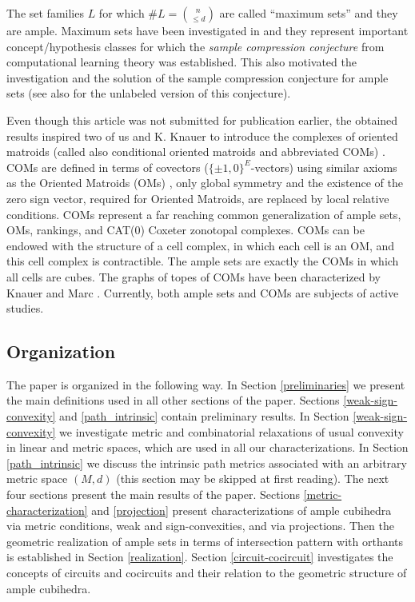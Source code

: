 \documentclass[11pt,a4paper]{amsart}
\theoremstyle{definition}
\numberwithin{equation}{section}
\newcommand{\covectors}{\ensuremath{L}}
\newcommand{\MM}{\ensuremath{M}}
\begin{document}
The set families $L$ for which $\#L=\binom{n}{\le d}$ are called ``maximum sets'' \cite{GaWe} and they are ample. Maximum sets have been investigated in  \cite{GaWe} and they represent important concept/hypothesis classes for which  the \emph{sample compression conjecture} \cite{FlWa} from computational learning theory was established. This also motivated the investigation and the solution of the sample compression conjecture for ample sets  \cite{MoWa} (see also \cite{ChChMoWa} for the unlabeled version of this conjecture).


Even though this article was not submitted for publication earlier, the obtained results inspired two of us and K. Knauer to introduce the  complexes of oriented matroids (called also conditional oriented matroids and abbreviated COMs) \cite{BaChKn}. COMs are defined in terms of covectors ($\{ \pm 1, 0\}^E$-vectors) using similar axioms as the Oriented Matroids (OMs) \cite{BjLVStWhZi}, only global symmetry and the existence of the
zero sign vector, required for Oriented Matroids, are replaced by local relative conditions.  COMs represent a far reaching common generalization of ample sets, OMs, rankings, and CAT(0) Coxeter zonotopal complexes.  COMs can be endowed with the structure of a cell complex, in which each cell is an OM, and this cell complex is contractible.
The ample sets are exactly the COMs in which all cells are cubes.
The graphs of topes of COMs have been characterized by Knauer and Marc \cite{KnMa}. Currently, both ample sets and COMs are subjects of active studies.


\subsection*{Organization}
The paper is organized in the following way. In Section \ref{preliminaries} we present the main definitions used in all other sections of the paper.  Sections \ref{weak-sign-convexity} and \ref{path_intrinsic} contain preliminary results. In Section \ref{weak-sign-convexity} we investigate  metric and combinatorial relaxations of usual convexity in linear and metric spaces, which are used in all our characterizations. In Section \ref{path_intrinsic}  we discuss the intrinsic path metrics associated with an arbitrary metric space $(\MM, d)$
(this section may be skipped at first reading). The next four sections present the main results of the paper. Sections \ref{metric-characterization}  and \ref{projection}
present characterizations of ample cubihedra via metric conditions, weak and sign-convexities,  and via projections. Then the geometric
realization of ample sets in terms of intersection pattern with orthants is established in Section \ref{realization}. Section \ref{circuit-cocircuit} investigates the concepts of circuits and cocircuits and their relation to the geometric structure of ample cubihedra.
\end{document}
